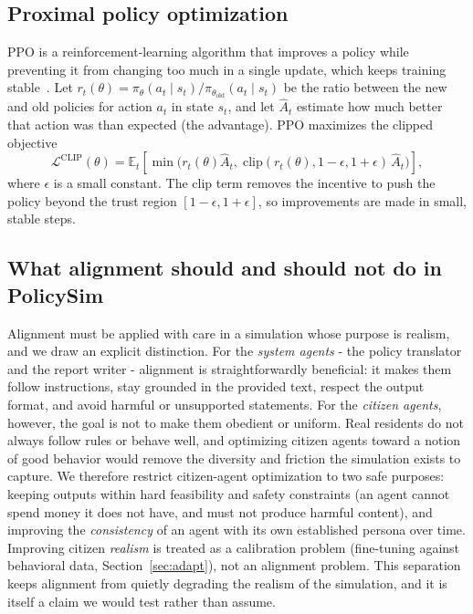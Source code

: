 \documentclass[conference]{IEEEtran}
\begin{document}
\subsection{Proximal policy optimization}
PPO is a reinforcement-learning algorithm that improves a policy while preventing it from changing too much in a single update, which keeps training stable~\cite{schulman2017}. Let $r_t(\theta) = \pi_\theta(a_t\mid s_t)/\pi_{\theta_{\text{old}}}(a_t\mid s_t)$ be the ratio between the new and old policies for action $a_t$ in state $s_t$, and let $\hat{A}_t$ estimate how much better that action was than expected (the advantage). PPO maximizes the clipped objective
\begin{equation}
\mathcal{L}^{\mathrm{CLIP}}(\theta) = \mathbb{E}_t\!\left[\min\!\big(r_t(\theta)\hat{A}_t,\; \mathrm{clip}(r_t(\theta), 1-\epsilon, 1+\epsilon)\,\hat{A}_t\big)\right],
\end{equation}
where $\epsilon$ is a small constant. The clip term removes the incentive to push the policy beyond the trust region $[1-\epsilon, 1+\epsilon]$, so improvements are made in small, stable steps.

\subsection{What alignment should and should not do in PolicySim}
Alignment must be applied with care in a simulation whose purpose is realism, and we draw an explicit distinction. For the \emph{system agents} - the policy translator and the report writer - alignment is straightforwardly beneficial: it makes them follow instructions, stay grounded in the provided text, respect the output format, and avoid harmful or unsupported statements. For the \emph{citizen agents}, however, the goal is not to make them obedient or uniform. Real residents do not always follow rules or behave well, and optimizing citizen agents toward a notion of good behavior would remove the diversity and friction the simulation exists to capture. We therefore restrict citizen-agent optimization to two safe purposes: keeping outputs within hard feasibility and safety constraints (an agent cannot spend money it does not have, and must not produce harmful content), and improving the \emph{consistency} of an agent with its own established persona over time. Improving citizen \emph{realism} is treated as a calibration problem (fine-tuning against behavioral data, Section~\ref{sec:adapt}), not an alignment problem. This separation keeps alignment from quietly degrading the realism of the simulation, and it is itself a claim we would test rather than assume.
\end{document}
